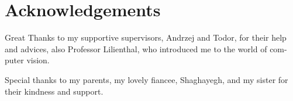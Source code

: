 \cleardoublepage
{}
{}
\chapter*{Acknowledgements}

Great Thanks to my supportive supervisors, Andrzej and Todor, for their help
and advices, also Professor Lilienthal, who introduced me to the world of com-
puter vision.

Special thanks to my parents, my lovely fiancee, Shaghayegh, and my sister
for their kindness and support.


% 
